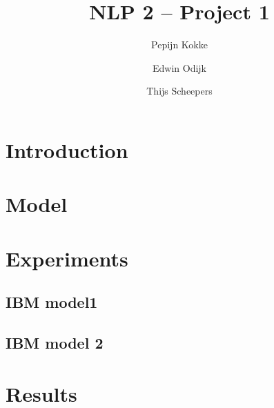 \documentclass[11pt]{article}
\title{NLP 2 -- Project 1}
\author{Pepijn Kokke \and Edwin Odijk \and Thijs Scheepers}
\date{}
\begin{document}
\maketitle

\begin{abstract}
\end{abstract}

\section{Introduction}

\section{Model}

\section{Experiments}

\subsection{IBM model1}

\subsection{IBM model 2}

\section{Results}
\end{document}
